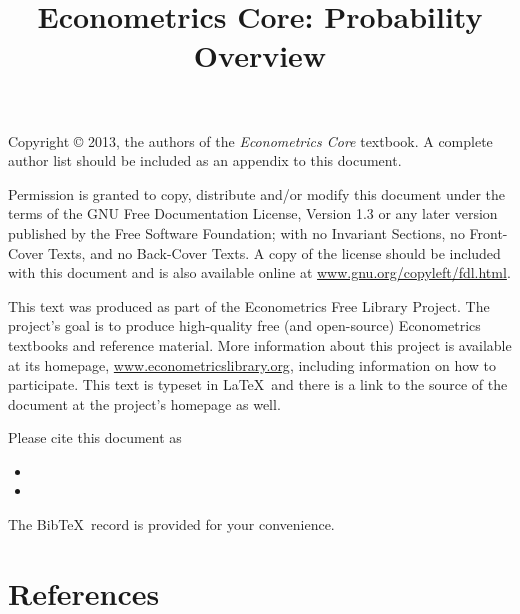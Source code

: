 \documentclass{tex/tufte-handout}
\title{Econometrics Core: Probability Overview}
\begin{document}
\maketitle

\bigskip\noindent%
Copyright © 2013, the authors of the \textit{Econometrics Core}
textbook.  A complete author list should be included as an appendix to
this document.

Permission is granted to copy, distribute and/or modify this document
under the terms of the GNU Free Documentation License, Version 1.3 or
any later version published by the Free Software Foundation; with no
Invariant Sections, no Front-Cover Texts, and no Back-Cover Texts.  A
copy of the license should be included with this document and is also
available online at \url{www.gnu.org/copyleft/fdl.html}.

This text was produced as part of the Econometrics Free Library
Project.  The project's goal is to produce high-quality free (and
open-source) Econometrics textbooks and reference material.  More
information about this project is available at its homepage,
\url{www.econometricslibrary.org}, including information on how
to participate.  This text is typeset in \LaTeX\ and there is a link
to the source of the document at the project's homepage as well.

Please cite this document as
\begin{itemize}
\item[] 
\item[] 
\end{itemize}
The Bib\!\TeX\ record is provided for your convenience.

\tableofcontents
\listoftables
\listoffigures







\part*{References}%

\end{document}
